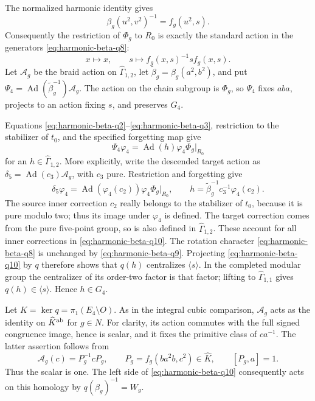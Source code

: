 The normalized harmonic identity gives
\[
 \beta_g(u^2,v^2)^{-1}=f_g(u^2,s).
\]
Consequently the restriction of \(\Phi_g\) to \(R_0\) is
exactly the standard action in the generators \eqref{eq:harmonic-beta-q8}:
\begin{equation}
 x\longmapsto x,\qquad
 s\longmapsto f_g(x,s)^{-1}s f_g(x,s).                       \label{eq:harmonic-beta-q9}
\end{equation}
Let \(\mathcal A_g\) be the braid action on
\(\widehat\Gamma_{1,2}\), let
\(\widetilde\beta_g=\beta_g(a^2,b^2)\), and put
\(\Psi_4=\operatorname{Ad}(\widetilde\beta_g^{-1})\mathcal A_g\).
The action on the chain subgroup is \(\Phi_g\), so
\(\Psi_4\) fixes \(aba\), projects to an action fixing \(s\),
and preserves \(G_4\).

Equations \eqref{eq:harmonic-beta-q2}--\eqref{eq:harmonic-beta-q3}, restriction to the stabilizer of \(t_0\),
and the specified forgetting map give
\begin{equation}
 \Psi_4\varphi_4
       =\operatorname{Ad}(h)\varphi_4\Phi_g|_{R_0}            \label{eq:harmonic-beta-q10}
\end{equation}
for an \(h\in\widehat\Gamma_{1,2}\). More explicitly, write the
descended target action as
\(\delta_5=\operatorname{Ad}(c_3)\mathcal A_g\), with \(c_3\) pure.
Restriction and forgetting give
\[
 \delta_5\varphi_4=
 \operatorname{Ad}(\varphi_4(c_2))\varphi_4\Phi_g|_{R_0},
 \qquad
 h=\widetilde\beta_g^{-1}c_3^{-1}\varphi_4(c_2).
\]
The source inner correction \(c_2\) really belongs to the
stabilizer of \(t_0\), because it is pure modulo two; thus
its image under \(\varphi_4\) is defined. The target correction
comes from the pure five-point group, so is also defined in
\(\widehat\Gamma_{1,2}\). These account for all inner
corrections in \eqref{eq:harmonic-beta-q10}.
The rotation character \eqref{eq:harmonic-beta-q8} is unchanged by \eqref{eq:harmonic-beta-q9}.
Projecting \eqref{eq:harmonic-beta-q10} by \(q\) therefore shows that \(q(h)\)
centralizes \(\langle s\rangle\). In the completed modular
group the centralizer of its order-two factor is that factor;
lifting to \(\widehat\Gamma_{1,1}\) gives
\(q(h)\in\langle s\rangle\). Hence \(h\in G_4\).

Let \(K=\ker q=\pi_1(E_4\setminus O)\).
As in the integral cubic comparison, \(\mathcal A_g\) acts
as the identity on \(\widehat K^{\rm ab}\) for \(g\in N\).
For clarity, its action commutes with the full signed
congruence image, hence is scalar, and it fixes the
primitive class of \(ca^{-1}\). The latter assertion follows
from
\[
 \mathcal A_g(c)=P_g^{-1}cP_g,\qquad
 P_g=f_g(ba^2b,c^2)\in\widehat K,\qquad [P_g,a]=1.
\]
Thus the scalar is one. The left side of \eqref{eq:harmonic-beta-q10} consequently
acts on this homology by \(q(\beta_g)^{-1}=W_g\).

